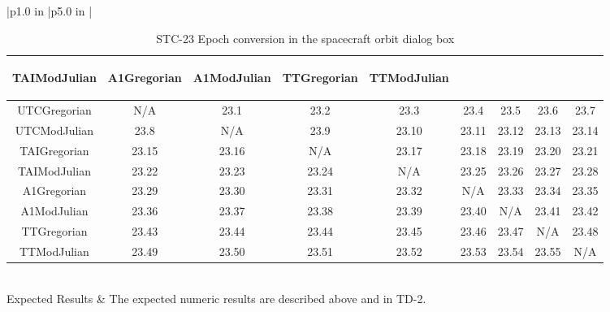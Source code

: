 \begin{table}[htbp!]
\begin{tabular}{|p{1.0 in} |p{5.0 in} |}
\begin{centering}
\begin{tabular}{|c|c|c|c|c|c|c|c|c|}
             {\begin{sideways}\parbox{2.5cm}{TAIModJulian}\end{sideways}} &
             {\begin{sideways}\parbox{2.5cm}{A1Gregorian}\end{sideways}}  &
             {\begin{sideways}\parbox{2.5cm}{A1ModJulian}\end{sideways}}  &
             {\begin{sideways}\parbox{2.5cm}{TTGregorian}\end{sideways}}  &
             {\begin{sideways}\parbox{2.5cm}{TTModJulian}\end{sideways}}  \\ \hline
             UTCGregorian & N/A & 23.1 & 23.2 & 23.3 & 23.4 & 23.5 & 23.6 & 23.7 \\ \hline
             UTCModJulian & 23.8 & N/A & 23.9 & 23.10 & 23.11 & 23.12 & 23.13 & 23.14\\ \hline
             TAIGregorian & 23.15 & 23.16 & N/A & 23.17 & 23.18 & 23.19 & 23.20 & 23.21\\ \hline
             TAIModJulian & 23.22 & 23.23 & 23.24 & N/A & 23.25 & 23.26 & 23.27 & 23.28\\ \hline
             A1Gregorian & 23.29 & 23.30 & 23.31 & 23.32 & N/A & 23.33 & 23.34 & 23.35\\ \hline
             A1ModJulian & 23.36 & 23.37 & 23.38 & 23.39 & 23.40 &  N/A & 23.41 & 23.42\\ \hline
             TTGregorian & 23.43 & 23.44 & 23.44 & 23.45 & 23.46 & 23.47 & N/A & 23.48\\ \hline
             TTModJulian & 23.49 & 23.50 & 23.51 & 23.52 & 23.53 & 23.54 & 23.55 & N/A\\ \hline
          \end{tabular}
          \end{centering} \vspace{0.1 in}\\
         \hline
         Expected Results & The expected numeric results are described above and in TD-2.\\
      \hline
\end{tabular}
   \label{Table:STC-23}
   \caption{STC-23 Epoch conversion in the spacecraft orbit dialog box}
\end{table} 